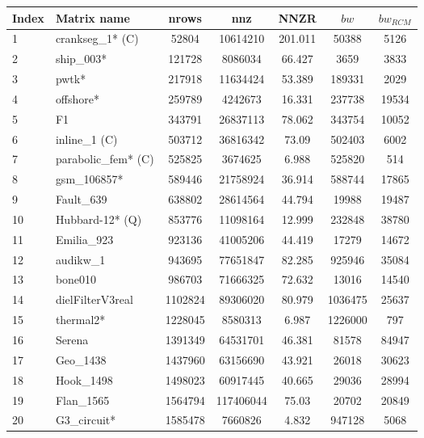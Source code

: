 \begin{tabular}{|l|l|S[table-format=7.0, table-space-text-pre=(, table-space-text-post=)]|S[table-format=8.0, table-space-text-pre=(, table-space-text-post=)]|S[round-mode=places,round-precision=2]|S[table-format=7.0, table-space-text-pre=(, table-space-text-post=)]|S[table-format=5.0, table-space-text-pre=(, table-space-text-post=)]|}
\toprule
{Index} & {Matrix name} &  {\acrshort{nrows}} & {\acrshort{nnz}} & {\acrshort{NNZR}}  & {$bw$} & {$bw_{RCM}$} \\
\midrule
{1}& {crankseg\_1* (C)}	& 52804	& 10614210	& 201.011	& 50388	& 5126	\\
{2}& {ship\_003*}	& 121728	& 8086034	& 66.427	& 3659	& 3833	\\
{3}& {pwtk*}	& 217918	& 11634424	& 53.389	& 189331	& 2029	\\
{4}& {offshore*}	& 259789	& 4242673	& 16.331	& 237738	& 19534	\\
{5}& {F1}	& 343791	& 26837113	& 78.062	& 343754	& 10052	\\
{6}& {inline\_1 (C)}	& 503712	& 36816342	& 73.09	& 502403	& 6002	\\
{7}& {parabolic\_fem* (C)}	& 525825	& 3674625	& 6.988	& 525820	& 514	\\
{8}& {gsm\_106857*}	& 589446	& 21758924	& 36.914	& 588744	& 17865	\\
{9}& {Fault\_639}	& 638802	& 28614564	& 44.794	& 19988	& 19487	\\
{10}& {Hubbard-12* (Q)}	& 853776	& 11098164	& 12.999	& 232848	& 38780	\\
{11}& {Emilia\_923}	& 923136	& 41005206	& 44.419	& 17279	& 14672	\\
{12}& {audikw\_1}	& 943695	& 77651847	& 82.285	& 925946	& 35084	\\
{13}& {bone010}	& 986703	& 71666325	& 72.632	& 13016	& 14540	\\
{14}& {dielFilterV3real}	& 1102824	& 89306020	& 80.979	& 1036475	& 25637	\\
{15}& {thermal2*}	& 1228045	& 8580313	& 6.987	& 1226000	& 797	\\
{16}& {Serena}	& 1391349	& 64531701	& 46.381	& 81578	& 84947	\\
{17}& {Geo\_1438}	& 1437960	& 63156690	& 43.921	& 26018	& 30623	\\
{18}& {Hook\_1498}	& 1498023	& 60917445	& 40.665	& 29036	& 28994	\\
{19}& {Flan\_1565}	& 1564794	& 117406044	& 75.03	& 20702	& 20849	\\
{20}& {G3\_circuit*}	& 1585478	& 7660826	& 4.832	& 947128	& 5068	\\

\end{tabular}
